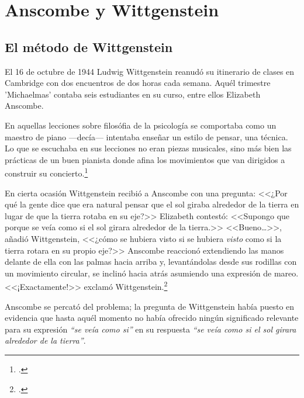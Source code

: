 \section{Anscombe y Wittgenstein}

\subsection{El método de Wittgenstein}
El 16 de octubre de 1944 Ludwig Wittgenstein reanudó su itinerario de clases en
Cambridge con dos encuentros de dos horas cada semana. Aquél trimestre
'Michaelmas' contaba seis estudiantes en su curso, entre ellos Elizabeth
Anscombe. 

 En aquellas lecciones sobre
filosófia de la psicología se comportaba como un maestro de piano ---decía---
intentaba enseñar un estilo de pensar, una técnica. Lo que se escuchaba en sus
lecciones no eran piezas musicales, sino más bien las prácticas de un buen
pianista donde afina los movimientos que van dirigidos a construir su
concierto.\footcite[p.~357]{pubnpriv}

En cierta ocasión Wittgenstein recibió a Anscombe con una pregunta: <<¿Por qué
la gente dice que era natural pensar que el sol giraba alrededor de la tierra en
lugar de que la tierra rotaba en su eje?>> Elizabeth contestó: <<Supongo que
porque se veía como si el sol girara alrededor de la tierra.>> <<Bueno\ldots>>,
añadió Wittgenstein, <<¿cómo se hubiera visto si se hubiera \emph{visto} como si
la tierra rotara en su propio eje?>> Anscombe reaccionó extendiendo las manos
delante de ella con las palmas hacia arriba y, levantándolas desde sus rodillas
con un movimiento circular, se inclinó hacia atrás asumiendo una expresión de
mareo. <<¡Exactamente!>> exclamó Wittgenstein.\footcite[cf.~][p.~151]{IWT}

Anscombe se percató del problema; la pregunta de Wittgenstein había puesto en
evidencia que hasta aquél momento no había ofrecido ningún significado relevante
para su expresión \emph{``se veía como si''} en su respuesta \emph{``se veía
  como si el sol girara alrededor de la tierra''}.


